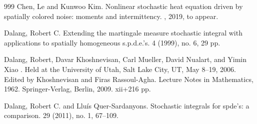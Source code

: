 \documentclass[a4paper,11pt]{article}
\theoremstyle{plain}
\theoremstyle{definition}
\numberwithin{NQ}{section}
\numberwithin{LQ}{section}
\numberwithin{ZQ}{section}
\begin{document}
\begin{small}
\begin{thebibliography}{999}
Chen, Le and Kunwoo Kim.
\newblock Nonlinear stochastic heat equation driven by spatially colored noise: moments and intermittency.
, 2019, to appear.

%



 Dalang, Robert C.
\newblock Extending the martingale measure stochastic integral with applications to spatially homogeneous s.p.d.e.'s.
 4 (1999), no. 6, 29 pp.
%

 Dalang, Robert, Davar Khoshnevisan, Carl 
Mueller, David Nualart, and Yimin Xiao
.
\newblock Held at the University of Utah, Salt Lake City, UT, May 8–19, 2006. 
Edited by  Khoshnevisan and Firas Rassoul-Agha. Lecture Notes in Mathematics, 
1962.  
\newblock Springer-Verlag, Berlin, 2009. xii+216 pp.


%
%
%
Dalang, Robert C. and Llu\'is Quer-Sardanyons.
\newblock Stochastic integrals for spde's: a comparison.
 29 (2011), no. 1, 67--109. 


\end{thebibliography}
\end{small}
\end{document}
